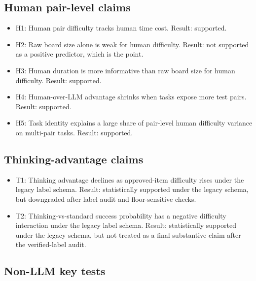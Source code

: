 \documentclass[11pt]{article}
\begin{document}
\subsection*{Human pair-level claims}

\begin{itemize}
  \item H1: Human pair difficulty tracks human time cost. Result: supported.
  \item H2: Raw board size alone is weak for human difficulty. Result: not supported as a positive predictor, which is the point.
  \item H3: Human duration is more informative than raw board size for human difficulty. Result: supported.
  \item H4: Human-over-LLM advantage shrinks when tasks expose more test pairs. Result: supported.
  \item H5: Task identity explains a large share of pair-level human difficulty variance on multi-pair tasks. Result: supported.
\end{itemize}

\subsection*{Thinking-advantage claims}

\begin{itemize}
  \item T1: Thinking advantage declines as approved-item difficulty rises under the legacy label schema. Result: statistically supported under the legacy schema, but downgraded after label audit and floor-sensitive checks.
  \item T2: Thinking-vs-standard success probability has a negative difficulty interaction under the legacy label schema. Result: statistically supported under the legacy schema, but not treated as a final substantive claim after the verified-label audit.
\end{itemize}

\subsection*{Non-LLM key tests}
\end{document}
